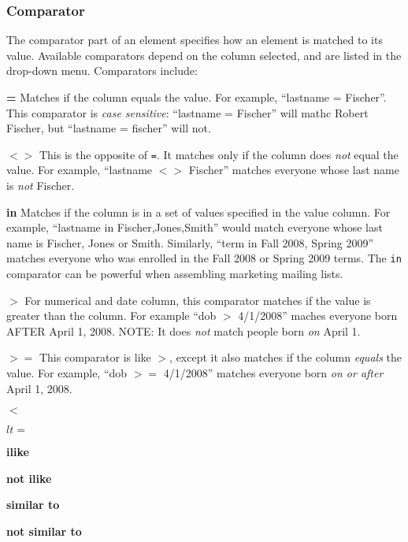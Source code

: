 \documentclass[11pt]{article}
\begin{document}
\subsubsection{Comparator}

The comparator part of an element specifies how an element is matched to its value.  Available comparators depend on the column selected, and are listed in the drop-down menu.  Comparators include:

\begin{description}

\item{{\bf =}} Matches if the column equals the value.  For example, ``lastname = Fischer''.  This comparator is \emph{case sensitive}: ``lastname = Fischer'' will mathc Robert Fischer, but ``lastname = fischer'' will not.

\item{{\bf $<>$}} This is the opposite of {\tt =}.  It matches only if the column does \emph{not} equal the value.  For example, ``lastname $<>$ Fischer'' matches everyone whose last name is \emph{not} Fischer.

\item{{\bf in}} Matches if the column is in a set of values specified in the value column.  For example, ``lastname in Fischer,Jones,Smith'' would match everyone whose last name is Fischer, Jones or Smith.  Similarly, ``term in Fall 2008, Spring 2009'' matches everyone who was enrolled in the Fall 2008 or Spring 2009 terms.  The {\tt in} comparator can be powerful when assembling marketing mailing lists.

\item{{\bf $>$}} For numerical and date column, this comparator matches if the value is greater than the column.  For example ``dob $>$ 4/1/2008'' maches everyone born AFTER April 1, 2008.  NOTE: It does \emph{not} match people born \emph{on} April 1.

\item{{\bf $>=$}} This comparator is like $>$, except it also matches if the column \emph{equals} the value.  For example, ``dob $>=$ 4/1/2008'' matches everyone born \emph{on or after} April 1, 2008.

\item{{\bf $<$}}

\item{{\bf $lt=$}}

\item{{\bf ilike}}

\item{{\bf not ilike}}

\item{{\bf similar to}}
\item{{\bf not similar to}}

\end{description}
\end{document}
